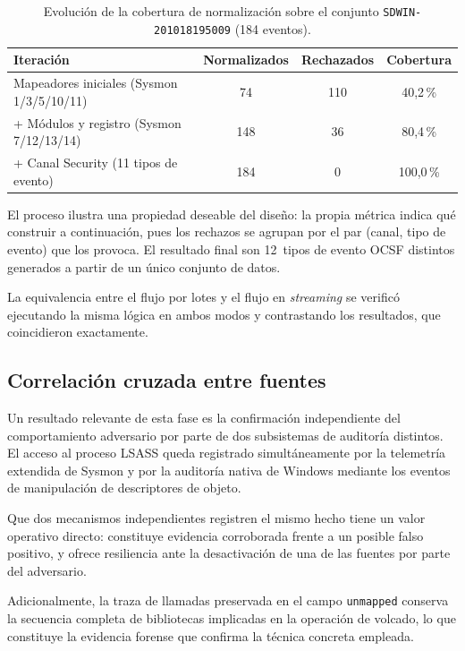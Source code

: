 \begin{table}[H]
\centering
\begin{tabular}{|l|c|c|c|}
\hline
\textbf{Iteración} & \textbf{Normalizados} & \textbf{Rechazados} & \textbf{Cobertura} \\
\hline
Mapeadores iniciales (Sysmon 1/3/5/10/11) & 74 & 110 & 40{,}2\,\% \\
+ Módulos y registro (Sysmon 7/12/13/14) & 148 & 36 & 80{,}4\,\% \\
+ Canal Security (11 tipos de evento) & 184 & 0 & 100{,}0\,\% \\
\hline
\end{tabular}
\caption{Evolución de la cobertura de normalización sobre el conjunto \texttt{SDWIN-201018195009} (184 eventos).}
\label{tab:cobertura}
\end{table}

El proceso ilustra una propiedad deseable del diseño: la propia métrica indica qué construir a
continuación, pues los rechazos se agrupan por el par (canal, tipo de evento) que los provoca.
El resultado final son 12~tipos de evento OCSF distintos generados a partir de un único
conjunto de datos.

La equivalencia entre el flujo por lotes y el flujo en \textit{streaming} se verificó
ejecutando la misma lógica en ambos modos y contrastando los resultados, que coincidieron
exactamente.

\subsection{Correlación cruzada entre fuentes}

Un resultado relevante de esta fase es la confirmación independiente del comportamiento
adversario por parte de dos subsistemas de auditoría distintos. El acceso al proceso LSASS
queda registrado simultáneamente por la telemetría extendida de Sysmon y por la auditoría
nativa de Windows mediante los eventos de manipulación de descriptores de objeto.

Que dos mecanismos independientes registren el mismo hecho tiene un valor operativo directo:
constituye evidencia corroborada frente a un posible falso positivo, y ofrece resiliencia
ante la desactivación de una de las fuentes por parte del adversario.

Adicionalmente, la traza de llamadas preservada en el campo \texttt{unmapped} conserva la
secuencia completa de bibliotecas implicadas en la operación de volcado, lo que constituye la
evidencia forense que confirma la técnica concreta empleada.

